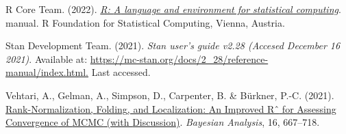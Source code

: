 \documentclass[
  12pt,
  letterpaper,
  DIV=11,
  numbers=noendperiod]{scrartcl}
\newlength{\cslhangindent}
\newlength{\cslentryspacingunit} %
\newenvironment{CSLReferences}[2] %
 {%
  \setlength{\parindent}{0pt}
  \ifodd #1
  \let\oldpar\par
  \def\par{\hangindent=\cslhangindent\oldpar}
  \fi
  \setlength{\parskip}{#2\cslentryspacingunit}
 }%
 {}
\begin{document}
\begin{CSLReferences}{1}{0}
\leavevmode{}%
R Core Team. (2022). \emph{\href{https://www.R-project.org/}{R: {A}
language and environment for statistical computing}}. manual. {R
Foundation for Statistical Computing}, {Vienna, Austria}.

\leavevmode{}%
Stan Development Team. (2021). \emph{Stan user's guide v2.28 ({Accesed
December} 16 2021)}. Available at:
\href{https://mc-stan.org/docs/2_28/reference-manual/index.html}{https://mc-stan.org/docs/2\_28/reference-manual/index.html.}
Last accessed.

\leavevmode{}%
Vehtari, A., Gelman, A., Simpson, D., Carpenter, B. \& Bürkner, P.-C.
(2021). \href{https://doi.org/10.1214/20-BA1221}{Rank-{Normalization},
{Folding}, and {Localization}: {An Improved Rˆ} for {Assessing
Convergence} of {MCMC} (with {Discussion})}. \emph{Bayesian Analysis},
16, 667--718.

\end{CSLReferences}
\end{document}
